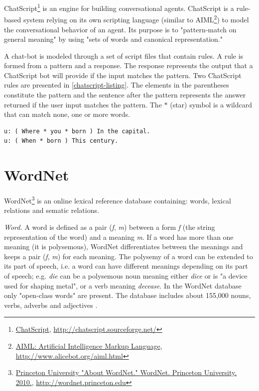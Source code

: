 ChatScript\footnote{\href{http://chatscript.sourceforge.net/}{ChatScript}, \url{http://chatscript.sourceforge.net/}} is an engine for building conversational agents. ChatScript is a rule-based system relying on its own scripting language (similar to AIML\footnote{\href{http://www.alicebot.org/aiml.html}{AIML: Artificial Intelligence Markup Language}, \url{http://www.alicebot.org/aiml.html}}) to model the conversational behavior of an agent. Its purpose is to "pattern-match on general meaning" by using "sets of words and canonical representation." \cite{Wilcox2011}

A chat-bot is modeled through a set of script files that contain rules. A rule is formed from a pattern and a response. The response represents the output that a ChatScript bot will provide if the input matches the pattern. Two ChatScript rules are presented in \autoref{chatscript-listing}.  The elements in the parentheses constitute the pattern and the sentence after the pattern represents the answer returned if the user input matches the pattern. The $ * $ (star) symbol is a wildcard that can match none, one or more words.

\begin{lstlisting}[float=htb,numbers=none, caption=ChatScript rules example, label=chatscript-listing]
u: ( Where * you * born ) In the capital.
u: ( When * born ) This century.
\end{lstlisting}

\section[WordNet]{WordNet}
\label{sec:wordnet}

WordNet\footnote{\href{http://wordnet.princeton.edu}{Princeton University "About WordNet." WordNet. Princeton University. 2010.}, \url{http://wordnet.princeton.edu}} is an online lexical reference database \cite{Miller1990,Miller1995} containing: words, lexical relations and sematic relations.

{\em Word.} A word is defined as a pair ({\em f}, {\em m}) between a form {\em f} (the string representation of the word) and a meaning {\em m}. If a word has more than one meaning (it is polysemous), WordNet differentiates between the meanings and keeps a pair ({\em f}, {\em m}) for each meaning. The polysemy of a word can be extended to its part of speech, i.e. a word can have different meanings depending on its part of speech; e.g. {\em die} can be a polysemous noun meaning either {\em dice} or is "a device used for shaping metal", or a verb meaning {\em decease}. In the WordNet database only "open-class words" are present. The database includes about 155,000 nouns, verbs, adverbs and adjectives \cite{Fellbaum1998}.

